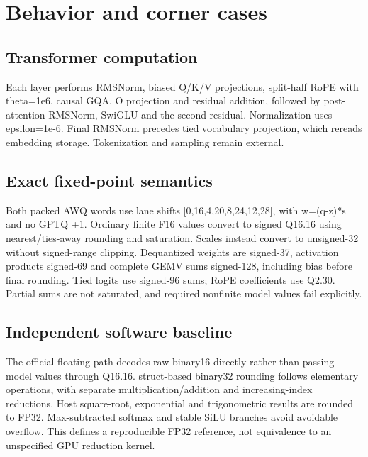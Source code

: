 \documentclass[11pt,a4paper]{article}
\begin{document}
\section{Behavior and corner cases}

\subsection{Transformer computation}

Each layer performs RMSNorm,\allowbreak{} biased Q/\allowbreak{}K/\allowbreak{}V projections,\allowbreak{} split-half RoPE with theta=\allowbreak{}1e6,\allowbreak{} causal GQA,\allowbreak{} O projection and residual addition,\allowbreak{} followed by post-attention RMSNorm,\allowbreak{} SwiGLU and the second residual. Normalization uses epsilon=\allowbreak{}1e-6. Final RMSNorm precedes tied vocabulary projection,\allowbreak{} which rereads embedding storage. Tokenization and sampling remain external.

\subsection{Exact fixed-point semantics}

Both packed AWQ words use lane shifts [\allowbreak{}0,\allowbreak{}16,\allowbreak{}4,\allowbreak{}20,\allowbreak{}8,\allowbreak{}24,\allowbreak{}12,\allowbreak{}28]\allowbreak{},\allowbreak{} with w=\allowbreak{}(\allowbreak{}q-z)\allowbreak{}*\allowbreak{}s and no GPTQ +\allowbreak{}1. Ordinary finite F16 values convert to signed Q16.16 using nearest/\allowbreak{}ties-away rounding and saturation. Scales instead convert to unsigned-32 without signed-range clipping. Dequantized weights are signed-37,\allowbreak{} activation products signed-69 and complete GEMV sums signed-128,\allowbreak{} including bias before final rounding. Tied logits use signed-96 sums; RoPE coefficients use Q2.30. Partial sums are not saturated,\allowbreak{} and required nonfinite model values fail explicitly.

\subsection{Independent software baseline}

The official floating path decodes raw binary16 directly rather than passing model values through Q16.16. struct-based binary32 rounding follows elementary operations,\allowbreak{} with separate multiplication/\allowbreak{}addition and increasing-index reductions. Host square-root,\allowbreak{} exponential and trigonometric results are rounded to FP32. Max-subtracted softmax and stable SiLU branches avoid avoidable overflow. This defines a reproducible FP32 reference,\allowbreak{} not equivalence to an unspecified GPU reduction kernel.
\end{document}
